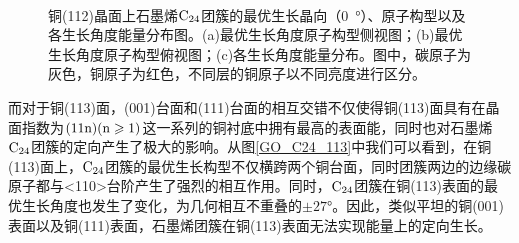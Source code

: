         \begin{figure}[htb]
            \\[-0.5ex]
            \caption{铜(112)晶面上石墨烯$\rm{C_{24}}$团簇的最优生长晶向（\SI{0}  {\degree}）、原子构型以及各生长角度能量分布图。(a)最优生长角度原子构型侧视图；(b)最优生长角度原子构型俯视图；(c)各生长角度能量分布。图中，碳原子为灰色，铜原子为红色，不同层的铜原子以不同亮度进行区分。}
            \label{fig:GO_C24_112}
        \end{figure}

        而对于铜(113)面，(001)台面和(111)台面的相互交错不仅使得铜(113)面具有在晶面指数为$\rm{(11n)(n \geqslant 1)}$这一系列的铜衬底中拥有最高的表面能，同时也对石墨烯$\rm{C_{24}}$团簇的定向产生了极大的影响。从图\ref{GO_C24_113}中我们可以看到，在铜(113)面上，$\rm{C_{24}}$团簇的最优生长构型不仅横跨两个铜台面，同时团簇两边的边缘碳原子都与<110>台阶产生了强烈的相互作用。同时，$\rm{C_{24}}$团簇在铜(113)表面的最优生长角度也发生了变化，为几何相互不重叠的$\pm 27 \si{\degree}$。因此，类似平坦的铜(001)表面以及铜(111)表面，石墨烯团簇在铜(113)表面无法实现能量上的定向生长。

